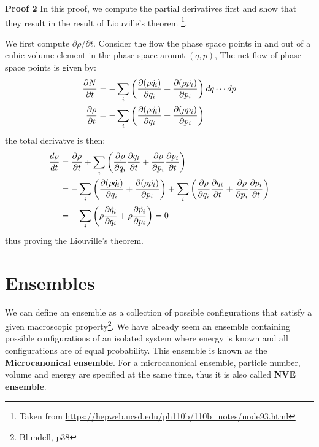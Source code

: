 \documentclass{article}
\begin{document}
\textbf{Proof 2} In this proof, we compute the partial derivatives first and show that they result in the result of Liouville's theorem
\footnote{Taken from \url{https://hepweb.ucsd.edu/ph110b/110b_notes/node93.html}}.

We first compute $\partial \rho / \partial t$. Consider the flow the phase space points in and out of a cubic volume element 
in the phase space arount $(q,p)$, The net flow of phase space points is given by:
\begin{align}
    \frac{\partial N}{\partial t} 
    &= -\sum_i \left( \frac{\partial (\rho \dot{q_i})}{\partial q_i} + \frac{\partial (\rho \dot{p_i})}{\partial p_i} \right) dq \cdots dp \notag \\
    \frac{\partial \rho}{\partial t} 
    &= -\sum_i \left( \frac{\partial (\rho \dot{q_i})}{\partial q_i} + \frac{\partial (\rho \dot{p_i})}{\partial p_i} \right)
\end{align}
the total derivatve is then:
\begin{align}
    \frac{d\rho}{dt} &= \frac{\partial \rho}{\partial t}
    + \sum_i \left( \frac{\partial \rho}{\partial q_i}\frac{\partial q_i}{\partial t} + \frac{\partial \rho}{\partial p_i}\frac{\partial p_i}{\partial t} \right) \notag \\
    &= -\sum_i \left( \frac{\partial (\rho \dot{q_i})}{\partial q_i} + \frac{\partial (\rho \dot{p_i})}{\partial p_i} \right) 
    + \sum_i \left( \frac{\partial \rho}{\partial q_i}\frac{\partial q_i}{\partial t} + \frac{\partial \rho}{\partial p_i}\frac{\partial p_i}{\partial t} \right) \notag \\
    &= - \sum_i \left( \rho\frac{\partial \dot{q_i}}{\partial q_i} + \rho\frac{\partial \dot{p_i}}{\partial p_i}  \right) = 0
\end{align}
thus proving the Liouville's theorem.


\section{Ensembles}
We can define an ensemble as a collection of possible configurations that satisfy a given macroscopic 
property\footnote{Blundell, p38}.
We have already seem an ensemble containing possible configurations of an isolated system where energy
is known and all configurations are of equal probability. 
This ensemble is known as the \textbf{Microcanonical ensemble}. For a microcanonical ensemble, particle 
number, volume and energy are specified at the same time, thus it is also called \textbf{NVE ensemble}.
\end{document}
